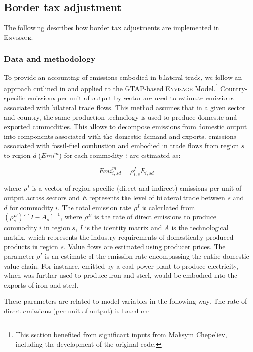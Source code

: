 \documentclass[11pt,letterpaper]{report}
\begin{document}
\subsection{Border tax adjustment}

The following describes how border tax
adjustments are implemented in \textsc{Envisage}.

\subsubsection{Data and methodology}

To provide an accounting of \COT{} emissions embodied in bilateral trade, we follow an approach outlined in
\cite{PetersJEcolEcon2008} and applied to the GTAP-based \textsc{Envisage} Model.\footnote{This section benefited from significant inputs
from Maksym Chepeliev, including the development of the original code.}
Country-specific \COT{} emissions per unit of output by sector are used to estimate emissions associated with bilateral trade
flows. This method assumes that in a given sector and country, the same production technology is used to produce domestic and
exported commodities. This allows to decompose emissions from domestic output into components associated with the domestic demand and exports. \COT{} emissions associated with fossil-fuel combustion and embodied in trade flows from region $s$ to region $d$ ($\mathit{Emi}^m$) for each commodity $i$ are estimated as:

\[
\mathit{Emi}^m_{i,sd} = {\rho^I_{i,s}} {E_{i,sd}}
\]

\noindent where $\rho^I$ is a vector of region-specific \COT{} (direct and indirect) emissions per unit of output across sectors
and $E$ represents the level of bilateral trade between $s$ and $d$ for commodity $i$. The total emission
rate $\rho^I$ is calculated from ${\left(\rho^D_{s}\right)'}{\left[I-A_s\right]^{-1}}$, where $\rho^D$ is
the rate of direct emissions to produce commodity $i$ in region $s$, $I$ is the identity matrix and $A$ is the technological matrix, which represents the industry requirements of domestically produced products in region $s$.
Value flows are estimated using producer prices. The parameter $\rho^I$ is an estimate of the emission rate encompassing the entire domestic value chain.
For instance, \COT{} emitted by a coal power plant to produce electricity,
which was further used to produce iron and steel, would be embodied into the exports of iron and steel.

These parameters are related to model variables in the following way. The rate of direct emissions (per unit of
output) is based on:
\end{document}
